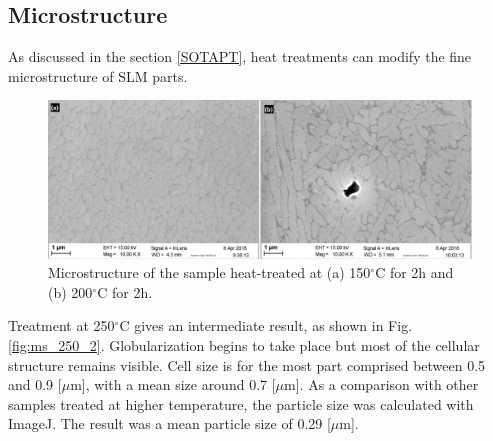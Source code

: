 
\subsection{Microstructure}

As discussed in the section \ref{SOTAPT}, heat treatments can modify the fine microstructure of SLM parts.\\

\begin{figure}[ht]
	\centering
	\centerline{\includegraphics[scale=0.30]{Images/SEM-TT150&200-2-real}}
	\decoRule
	\caption[Microstructure of the sample heat-treated at (a) 150$^\circ$C for 2h and (b) 200$^\circ$C for 2h]{Microstructure of the sample heat-treated at (a) 150$^\circ$C for 2h and (b) 200$^\circ$C for 2h.}
	\label{fig:ms_150_200_2}
\end{figure}

Treatment at 250$^\circ$C gives an intermediate result, as shown in Fig. \ref{fig:ms_250_2}. Globularization begins to take place but most of the cellular structure remains visible. Cell size is for the most part comprised between 0.5 and 0.9 [$\mu$m], with a mean size around 0.7 [$\mu$m]. As a comparison with other samples treated at higher temperature, the particle size was calculated with ImageJ. The result was a mean particle size of 0.29 [$\mu$m]. \\

